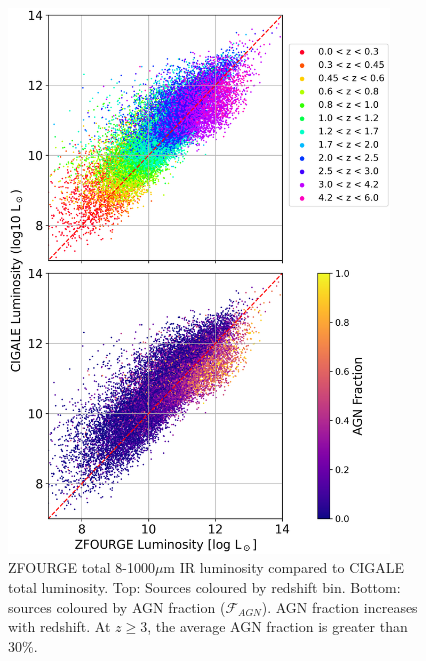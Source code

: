 \begin{figure}
    \centering
    \includegraphics[width=0.9\textwidth]{Figures/LIR_vs_LIR.png}
    \caption{ZFOURGE total 8-1000$\mu$m IR luminosity compared to CIGALE total luminosity. Top: Sources coloured by redshift bin. Bottom: sources coloured by AGN fraction ($\mathcal{F}_{AGN}$). AGN fraction increases with redshift. At $z \geq 3$, the average AGN fraction is greater than 30\%.}
    \label{Fig: LIR vs LIR}
\end{figure}

